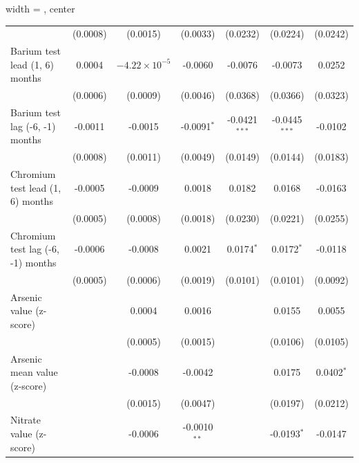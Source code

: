 \begin{table}[htbp]
\begin{adjustbox}{width = \textwidth, center}
\begin{tabular}{lcccccc}
                                                & (0.0008)       & (0.0015)               & (0.0033)        & (0.0232)        & (0.0224)        & (0.0242)\\   
         Barium test lead (1, 6) months         & 0.0004         & $-4.22\times 10^{-5}$  & -0.0060         & -0.0076         & -0.0073         & 0.0252\\   
                                                & (0.0006)       & (0.0009)               & (0.0046)        & (0.0368)        & (0.0366)        & (0.0323)\\   
         Barium test lag (-6, -1) months        & -0.0011        & -0.0015                & -0.0091$^{*}$   & -0.0421$^{***}$ & -0.0445$^{***}$ & -0.0102\\   
                                                & (0.0008)       & (0.0011)               & (0.0049)        & (0.0149)        & (0.0144)        & (0.0183)\\   
         Chromium test lead (1, 6) months       & -0.0005        & -0.0009                & 0.0018          & 0.0182          & 0.0168          & -0.0163\\   
                                                & (0.0005)       & (0.0008)               & (0.0018)        & (0.0230)        & (0.0221)        & (0.0255)\\   
         Chromium test lag (-6, -1) months      & -0.0006        & -0.0008                & 0.0021          & 0.0174$^{*}$    & 0.0172$^{*}$    & -0.0118\\   
                                                & (0.0005)       & (0.0006)               & (0.0019)        & (0.0101)        & (0.0101)        & (0.0092)\\   
         Arsenic value (z-score)                &                & 0.0004                 & 0.0016          &                 & 0.0155          & 0.0055\\   
                                                &                & (0.0005)               & (0.0015)        &                 & (0.0106)        & (0.0105)\\   
         Arsenic mean value (z-score)           &                & -0.0008                & -0.0042         &                 & 0.0175          & 0.0402$^{*}$\\   
                                                &                & (0.0015)               & (0.0047)        &                 & (0.0197)        & (0.0212)\\   
         Nitrate value (z-score)                &                & -0.0006                & -0.0010$^{**}$  &                 & -0.0193$^{*}$   & -0.0147\\   

\end{tabular}
\end{adjustbox}
\end{table}
